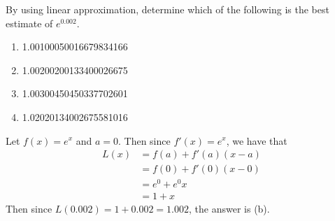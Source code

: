 \documentclass[nooutcomes,handout]{ximera}
\begin{document}
\begin{problem}

  By using linear approximation, determine which of the following is the best estimate of $e^{0.002}$.
  \begin{enumerate}
    \item1.00100050016679834166
    \item 1.00200200133400026675
    \item 1.00300450450337702601
    \item 1.02020134002675581016
  \end{enumerate}
  \begin{freeResponse}
    Let $f(x) = e^x$ and $a=0$.  Then since $f'(x) = e^x$, we have that
    \begin{align*}
      L(x) &= f(a) + f'(a)(x-a) \\
           &=  f(0) + f'(0)(x-0) \\
           &= e^0 + e^0x \\
           &= 1 + x
    \end{align*}
    Then since $L(0.002) = 1 + 0.002 = 1.002$, the answer is (b).
  \end{freeResponse}	
\end{problem}
\end{document}
